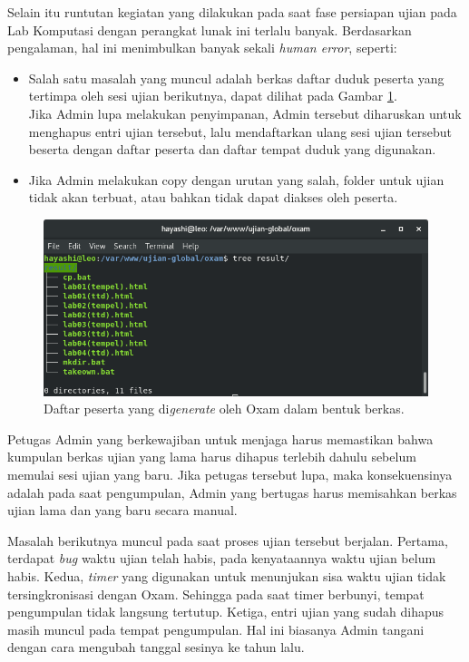 Selain itu runtutan kegiatan yang dilakukan pada saat fase persiapan ujian pada
Lab Komputasi dengan perangkat lunak ini terlalu banyak. Berdasarkan pengalaman,
hal ini menimbulkan banyak sekali \textit{human error}, seperti:
    \begin{itemize}
        \item Salah satu masalah yang muncul adalah berkas daftar duduk peserta
        yang tertimpa oleh sesi ujian berikutnya, dapat dilihat pada Gambar
        \ref{fig:ss-folder-gen}.\\
        Jika Admin lupa melakukan penyimpanan, Admin tersebut diharuskan untuk
        menghapus entri ujian tersebut, lalu mendaftarkan ulang sesi ujian
        tersebut beserta dengan daftar peserta dan daftar tempat duduk yang
        digunakan.
        \item Jika Admin melakukan copy dengan urutan yang salah, folder untuk
        ujian tidak akan terbuat, atau bahkan tidak dapat diakses oleh peserta.
        
    \end{itemize}

\begin{figure}
    \centering
    \includegraphics[width=0.7\paperwidth]{Gambar/ss-struktur-folder-generator.png}
    \caption{Daftar peserta yang di\textit{generate} oleh Oxam dalam bentuk
    berkas.}
    \label{fig:ss-folder-gen}
\end{figure}

Petugas Admin yang berkewajiban untuk menjaga harus memastikan bahwa kumpulan
berkas ujian yang lama harus dihapus terlebih dahulu sebelum memulai sesi ujian
yang baru. Jika petugas tersebut lupa, maka konsekuensinya adalah pada saat
pengumpulan, Admin yang bertugas harus memisahkan berkas ujian lama dan yang
baru secara manual.

Masalah berikutnya muncul pada saat proses ujian tersebut berjalan. Pertama,
terdapat \textit{bug} waktu ujian telah habis, pada kenyataannya waktu ujian
belum habis. Kedua, \textit{timer} yang digunakan untuk menunjukan sisa waktu
ujian tidak tersingkronisasi dengan Oxam. Sehingga pada saat timer berbunyi,
tempat pengumpulan tidak langsung tertutup. Ketiga, entri ujian yang sudah
dihapus masih muncul pada tempat pengumpulan. Hal ini biasanya Admin tangani
dengan cara mengubah tanggal sesinya ke tahun lalu.


